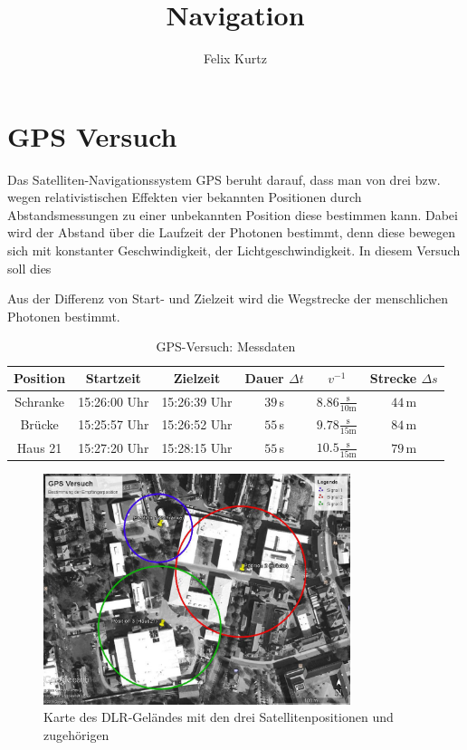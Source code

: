 \documentclass[12pt,a4paper,headinclude,bibtotoc]{scrartcl}
\begin{document}
\title{Navigation}
\author{Felix Kurtz}
\maketitle

\section{GPS Versuch}
Das Satelliten-Navigationssystem \textsc{GPS} beruht darauf, dass man von drei bzw. wegen relativistischen Effekten vier bekannten Positionen durch Abstandsmessungen zu einer unbekannten Position diese bestimmen kann.
Dabei wird der Abstand über die Laufzeit der Photonen bestimmt, denn diese bewegen sich mit konstanter Geschwindigkeit, der Lichtgeschwindigkeit.
In diesem Versuch soll dies 

Aus der Differenz von Start- und Zielzeit wird die Wegstrecke der menschlichen Photonen bestimmt.
\begin{table}[!htb]
	\centering
	\begin{tabular}{|c|c|c|c|c|c|}
		\hline		
		Position & Startzeit & Zielzeit & Dauer $\Delta t$ & $v^{-1}$ & Strecke $\Delta s$\\
		\hline
		Schranke & 15:26:00 Uhr & 15:26:39 Uhr & $39\,$s & $8.86 \frac{\si{\second}}{10\si{\meter}}$ & $44\,$m\\
		Brücke & 15:25:57 Uhr & 15:26:52 Uhr & $55\,$s & $9.78 \frac{\si{\second}}{15\si{\meter}}$ & $84\,$m\\
		Haus 21 & 15:27:20 Uhr & 15:28:15 Uhr & $55\,$s & $10.5 \frac{\si{\second}}{15\si{\meter}}$ & $79\,$m\\
		\hline
	\end{tabular}
	\caption{GPS-Versuch: Messdaten}
\end{table}

\begin{figure}[!htb]
	\centering
	\includegraphics[width=0.8\textwidth]{GPS.jpg}
	\caption{Karte des DLR-Geländes mit den drei Satellitenpositionen und zugehörigen}
	\label{fig:gps}
\end{figure}
\end{document}
